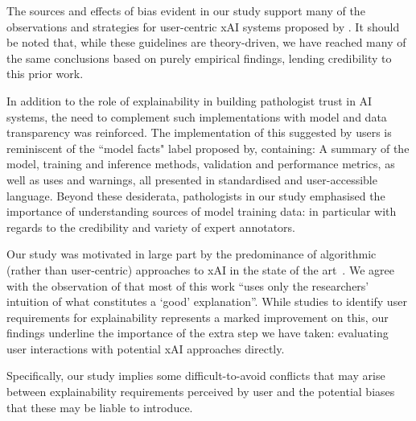 The sources and effects of bias evident in our study support many of the observations and strategies for user-centric xAI systems proposed by \citet{wang_designing_2019}. It should be noted that, while these guidelines are theory-driven, we have reached many of the same conclusions based on purely empirical findings, lending credibility to this prior work.


In addition to the role of explainability in building pathologist trust in AI systems, the need to complement such implementations with model and data transparency was reinforced. The implementation of this suggested by users is reminiscent of the ``model facts" label proposed by\cite{sendak2020presenting}, containing: A summary of the model, training and inference methods, validation and performance metrics, as well as uses and warnings, all presented in standardised and user-accessible language. Beyond these desiderata, pathologists in our study emphasised the importance of understanding sources of model training data: in particular with regards to the credibility and variety of expert annotators.

Our study was motivated in large part by the predominance of algorithmic (rather than user-centric) approaches to xAI in the state of the art~\cite{tjoa_survey_2020, poceviciute_survey_2020, antoniadi2021current}. We agree with the observation of \citet{miller2019explanation} that most of this work ``uses only the researchers' intuition of what constitutes a ‘good’ explanation''. While studies to identify user requirements for explainability represents a marked improvement on this, our findings underline the importance of the extra step we have taken: evaluating user interactions with potential xAI approaches directly.

Specifically, our study implies some difficult-to-avoid conflicts that may arise between explainability requirements perceived by user and the potential biases that these may be liable to introduce.

